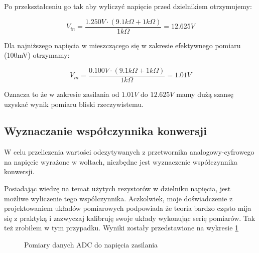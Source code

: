         Po przekształceniu go tak aby wyliczyć napięcie przed dzielnikiem otrzymujemy:
        
        \vspace{1em}
        \begin{displaymath}
         V_{in} = \frac{ 1.250V \cdot (9.1k \Omega  + 1k \Omega)  }{ 1k \Omega  } = 12.625 V
        \end{displaymath}
        \vspace{1em}
        
        Dla najniższego napięcia w mieszczącego się w zakresie efektywnego pomiaru (100mV) otrzymamy:
        
        \vspace{1em}
        \begin{displaymath}
         V_{in} = \frac{ 0.100V \cdot (9.1k \Omega  + 1k \Omega)  }{ 1k \Omega  } = 1.01 V
        \end{displaymath}      
        \vspace{1em}
        
        Oznacza to że w zakresie zasilania od $1.01V$ do $12.625V$ mamy dużą szansę uzyskać wynik pomiaru bliski rzeczywistemu.
        

        
    \subsection{Wyznaczanie współczynnika konwersji}
        W celu przeliczenia wartości odczytywanych z przetwornika analogowy-cyfrowego na napięcie wyrażone w woltach, niezbędne jest wyznaczenie współczynnika konwersji. 
        
        Posiadając wiedzę na temat użytych rezystorów w dzielniku napięcia, jest możliwe wyliczenie tego współczynnika. Aczkolwiek, moje doświadczenie z projektowaniem układów pomiarowych podpowiada że teoria bardzo często mija się z praktyką i zazwyczaj kalibruję swoje układy wykonując serię pomiarów. Tak też zrobiłem w tym przypadku. Wyniki zostały przedstawione na wykresie \ref{fig:adc_plot}
 
        \begin{figure}
        \vspace{1em}
            \centering
            \caption{Pomiary danych ADC do napięcia zasilania}
            \label{fig:adc_plot}
        \end{figure}
        \vspace{1em}
        
